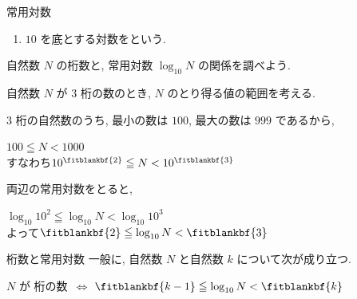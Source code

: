 \documentclass[14pt,dvipdfmx]{jsarticle}
\begin{document}

\vspace{-1.6zw}
\vspace{-0.35em}
\begin{reviewbox}{常用対数}
  \begin{enumerate}[label=\textbf{\arabic*}, leftmargin=1.5zw, itemsep=0.08em]
    \item $10$ を底とする対数をという.
  \end{enumerate}
\end{reviewbox}

\vspace{0.2em}
自然数 $N$ の桁数と, 常用対数 $\log_{10} N$ の関係を調べよう.

\vspace{0.15em}
\quad
自然数 $N$ が $3$ 桁の数のとき, $N$ のとり得る値の範囲を考える.
\par\vspace{0.12em}
$3$ 桁の自然数のうち, 最小の数は $100$, 最大の数は $999$ であるから,
\par\vspace{0.1em}
{\centering
$100 \leqq N < 1000$\\[0.45em]
すなわち\qquad $10^{\fitblankbf{2}} \leqq N < 10^{\fitblankbf{3}}$
\par}
\vspace{0.12em}
両辺の常用対数をとると,
\par\vspace{0.08em}
{\centering
$\log_{10} 10^{2} \leqq \log_{10} N < \log_{10} 10^{3}$\\[0.45em]
よって\qquad $\fitblankbf{2} \leqq \log_{10} N < \fitblankbf{3}$
\par}

\vspace{5em}
\begin{theorembox}{桁数と常用対数}
  一般に, 自然数 $N$ と自然数 $k$ について次が成り立つ.
  \par\vspace{0.12em}
  {\centering
  $N$ が  桁の数\qquad\
  $\Longleftrightarrow$\qquad
  $\fitblankbf{k-1} \leqq \log_{10} N < \fitblankbf{k}$
  \par}
\end{theorembox}
\end{document}
